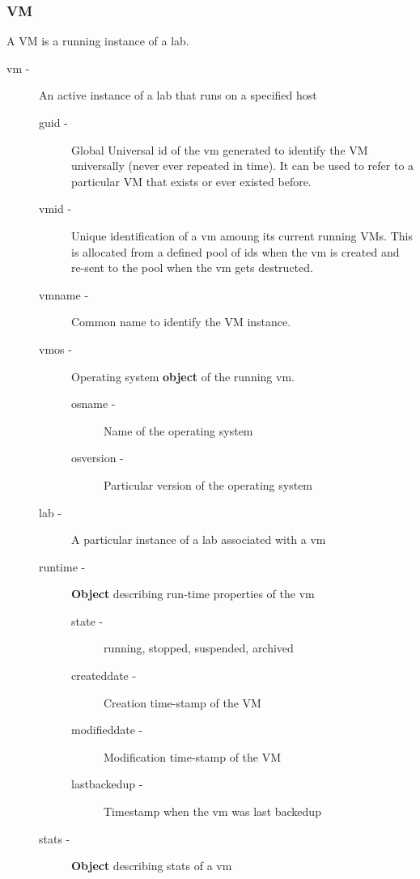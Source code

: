 \documentclass[11pt]{article}
\begin{document}
\subsubsection{VM}
\label{sec-3.2.6}


    A VM is a running instance of a lab.

\begin{description}
\item [vm -] An active instance of a lab that runs on a specified host

\begin{description}
\item [guid -] Global Universal id of the vm generated to identify
      the VM universally (never ever repeated in time). It can be used
      to refer to a particular VM that exists or ever existed before.
\item [vmid -] Unique identification of a vm amoung its current running
      VMs. This is allocated from a defined pool of ids when the vm is
      created and re-sent to the pool when the vm gets destructed.
\item [vmname -] Common name to identify the VM instance.
\item [vmos -] Operating system \textbf{object} of the running vm.

\begin{description}
\item [osname -] Name of the operating system
\item [osversion -] Particular version of the operating system
\end{description}

\item [lab -] A particular instance of a lab associated with a vm
\item [runtime -] \textbf{Object} describing run-time properties of the vm

\begin{description}
\item [state -]  running, stopped, suspended, archived
\item [createddate -] Creation time-stamp of the VM
\item [modifieddate -] Modification time-stamp of the VM
\item [lastbackedup -] Timestamp when the vm was last backedup
\end{description}

\item [stats -] \textbf{Object} describing stats of a vm


\end{description}
\end{description}
\end{document}
